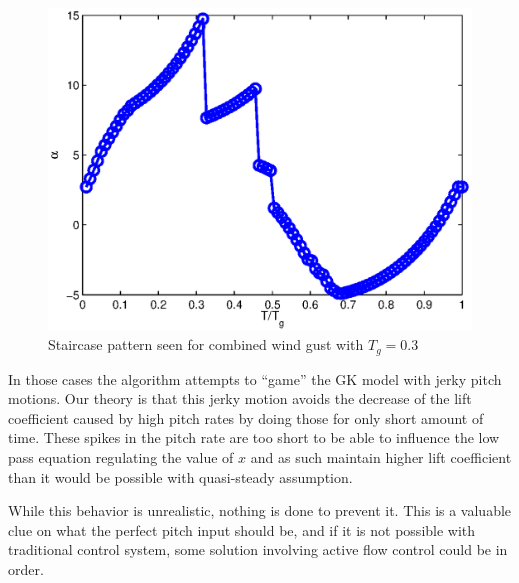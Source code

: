 \begin{figure}[h]
  \centering
  \includegraphics{./Figures/Alpha_vs_T_Windtype=3_Tg=0p3_GK_alphamax=20.eps}
  \caption{Staircase pattern seen for combined wind gust with $T_g=0.3$}
  \label{fig:staircase_case}
\end{figure}

\par In those cases the algorithm attempts to ``game'' the GK model with jerky pitch motions.
Our theory is that this jerky motion avoids the decrease of the lift coefficient caused by high pitch rates by doing those for only short amount of time.
These spikes in the pitch rate are too short to be able to influence the low pass equation regulating the value of $x$ and as such maintain higher lift coefficient than it would be possible with quasi-steady assumption.

\par While this behavior is unrealistic, nothing is done to prevent it.
This is a valuable clue on what the perfect pitch input should be, and if it is not possible with traditional control system, some solution involving active flow control could be in order.


